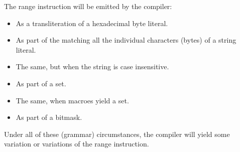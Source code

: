 The range instruction will be emitted by the compiler:

\begin{itemize}
\item As a transliteration of a hexadecimal byte literal.
\item As part of the matching all the individual characters (bytes) of
      a string literal.
\item The same, but when the string is case insensitive.
\item As part of a set.
\item The same, when macroes yield a set.
\item As part of a bitmask.
\end{itemize}

Under all of these (grammar) circumstances, the compiler will yield
some variation or variations of the range instruction.
